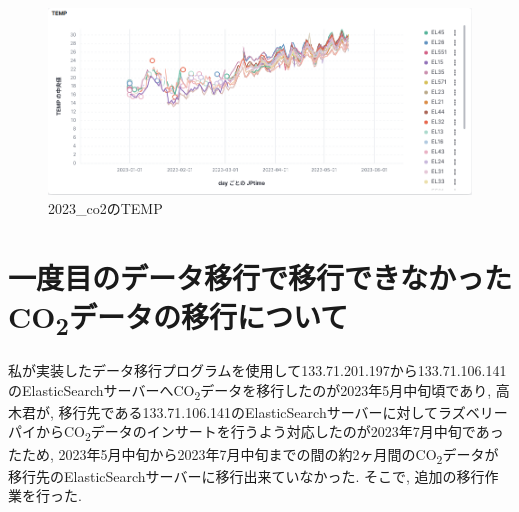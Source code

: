 \begin{figure}[!ht]
    \begin{center}
        \includegraphics[width=160mm]{sotu/figure/2023_temp.png}
        \caption{2023\_co2のTEMP}
        \label{p6}
    \end{center}
\end{figure}





\section{一度目のデータ移行で移行できなかったCO\textsubscript{2}データの移行について}

私が実装したデータ移行プログラムを使用して133.71.201.197から133.71.106.141のElasticSearchサーバーへCO\textsubscript{2}データを移行したのが2023年5月中旬頃であり, 高木君が, 移行先である133.71.106.141のElasticSearchサーバーに対してラズベリーパイからCO\textsubscript{2}データのインサートを行うよう対応したのが2023年7月中旬であったため, 2023年5月中旬から2023年7月中旬までの間の約2ヶ月間のCO\textsubscript{2}データが移行先のElasticSearchサーバーに移行出来ていなかった. そこで, 追加の移行作業を行った.

